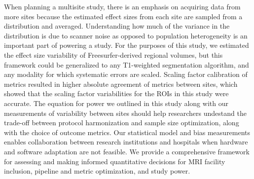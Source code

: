 When planning a multisite study, there is an emphasis on acquiring data from more sites because the estimated effect sizes from each site are sampled from a distribution and averaged. Understanding how much of the variance in the distribution is due to scanner noise as opposed to population heterogeneity is an important part of powering a study. For the purposes of this study, we estimated the effect size variability of Freesurfer-derived regional volumes, but this framework could be generalized to any T1-weighted segmentation algorithm, and any modality for which systematic errors are scaled. Scaling factor calibration of metrics resulted in higher absolute agreement of metrics between sites, which showed that the scaling factor variabilities for the ROIs in this study were accurate. The equation for power we outlined in this study along with our measurements of variability between sites should help researchers undestand the trade-off between protocol harmonization and sample size optimization, along with the choice of outcome metrics. Our statistical model and bias measurements enables collaboration between research institutions and hospitals when hardware and software adaptation are not feasible. We provide a comprehensive framework for assessing and making informed quantitative decisions for MRI facility inclusion, pipeline and metric optimization, and study power.
